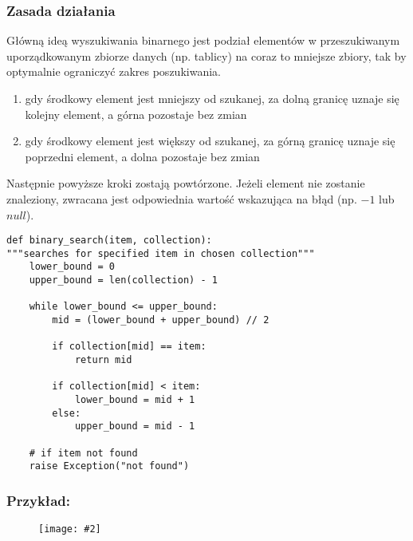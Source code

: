 \documentclass{beamer}
\newcommand{\obrazek}[2]{
        \begin{figure}[h]
            \centering
            \texttt{[image: \#2]}
        \end{figure}
    }
\begin{document}
\begin{frame}
    \frametitle{Zasada działania}
    Główną ideą wyszukiwania binarnego jest podział elementów w przeszukiwanym uporządkowanym zbiorze danych
    (np. tablicy) na coraz to mniejsze zbiory, tak by optymalnie ograniczyć zakres poszukiwania.

    \begin{enumerate}
        \item gdy środkowy element jest mniejszy od szukanej, za dolną granicę uznaje się kolejny element, a górna pozostaje bez zmian
        \item gdy środkowy element jest większy od szukanej, za górną granicę uznaje się poprzedni element,
              a dolna pozostaje bez zmian
    \end{enumerate}

    Następnie powyższe kroki zostają powtórzone. Jeżeli element nie zostanie znaleziony,
    zwracana jest odpowiednia wartość wskazująca na błąd (np. $-1$ lub $null$).
\end{frame}

\begin{verbatim}
def binary_search(item, collection):
"""searches for specified item in chosen collection"""
    lower_bound = 0
    upper_bound = len(collection) - 1

    while lower_bound <= upper_bound:
        mid = (lower_bound + upper_bound) // 2

        if collection[mid] == item:
            return mid

        if collection[mid] < item:
            lower_bound = mid + 1
        else:
            upper_bound = mid - 1

    # if item not found
    raise Exception("not found")
\end{verbatim}

\begin{frame}
    \frametitle{Przykład:}
    \obrazek{.5}{binarySearchExample.png}
\end{frame}
\end{document}
